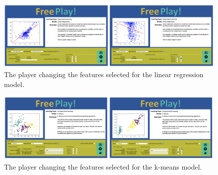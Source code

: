 		\begin{figure}[t]
			\begin{center}
				\includegraphics[width=15cm]{graphics/lr_changing_xy.png}
				\caption{The player changing the features selected for the linear regression model.}
				\label{fig:lr_changing_xy}
			\end{center}
		\end{figure}

		\begin{figure}[t]
			\begin{center}
				\includegraphics[width=15cm]{graphics/km_change_xy.png}
				\caption{The player changing the features selected for the k-means model.}
				\label{fig:km_change_xy}
			\end{center}
		\end{figure}
		
